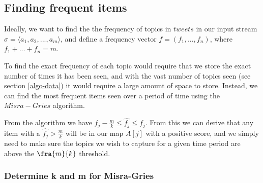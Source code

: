 \subsection{Finding frequent items}\label{algo-frequent}
Ideally, we want to find the the frequency of topics in $tweets$ in our input stream $\sigma = \langle a_{1}, a_{2},...,a_{m}\rangle$, and define a frequency vector $f = (f_{1},...,f_{n})$, where $f_{1} + ... + f_{n} = m$. 

To find the exact frequency of each topic would require that we store the exact number of times it has been seen, and with the vast number of topics seen (see section \ref{algo-data}) it would require a large amount of space to store. Instead, we can find the most frequent items seen over a period of time using the $Misra-Gries$ algorithm.\cite{Amit}
\newline

From the algorithm we have $f_j - \frac{m}{k} \leq \hat{f_j} \leq f_j$. From this we can derive that any item with a $\hat{f_j} > \frac{m}{k}$ will be in our map $A[j]$ with a positive score, and we simply need to make sure the topics we wish to capture for a given time period are above the $\fra{m}{k}$ threshold.

\subsubsection{Determine k and m for Misra-Gries}
